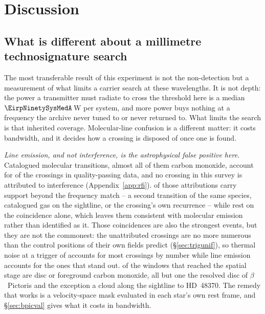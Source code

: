 \section{Discussion}
\label{sec:discussion}

\subsection{What is different about a millimetre technosignature search}
\label{sec:mmdifferent}

The most transferable result of this experiment is not the non-detection but
a measurement of what limits a carrier search at these wavelengths. It is not
depth: the power a transmitter must radiate to cross the threshold here is a median
$\EirpNinetySysMedA$\,W per system, and more power buys nothing at a
frequency the archive never tuned to or never returned to. What limits the
search is that inherited coverage. Molecular-line confusion is a different
matter: it costs bandwidth, and it decides how a crossing is disposed of once
one is found.

\emph{Line emission, and not interference, is the astrophysical false
positive here.}
Catalogued molecular transitions, almost all of them carbon monoxide, account
for \EvNAttrQp{} of the \EvNCrossQp{} crossings in quality-passing data, and
no crossing in this survey is attributed to interference
(Appendix~\ref{app:rfi}). \LnAttrSupp{} of those attributions carry support
beyond the frequency match -- a second transition of the same species,
catalogued gas on the sightline, or the crossing's own recurrence -- while
\LnAttrCoincWord{} rest on the coincidence alone, which leaves them
consistent with molecular emission rather than identified as it. Those coincidences are also the strongest events,
but they are not the commonest: the \EvNUnattrQp{} unattributed crossings are no more
numerous than the control positions of their own fields predict
(\S\ref{sec:trigunif}), so thermal noise at a trigger of \StageNullTrig{}
accounts for most crossings by number while line emission accounts for the
ones that stand out.
\DiscFpWin{} of the \DiscFpOfFlags{} windows that reached the spatial stage
are disc or foreground carbon monoxide, all but one the resolved disc of
$\beta$~Pictoris and the exception a cloud along the sightline to
HD~48370. The remedy that works is a velocity-space mask evaluated in each star's
own rest frame, and \S\ref{sec:bpicval} gives what it costs in
bandwidth.

